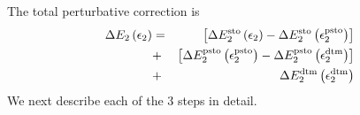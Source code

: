 \documentclass[%
preprint,
 superscriptaddress,
 amsmath,amssymb,
 aps,
]{revtex4-1}
\def\beq{\begin{eqnarray}}
\def\eeq{\end{eqnarray}}
\def\P{\mathcal{P}}
\begin{document}
The total perturbative correction is
\beq
\Delta E_{2} \left(\epsilon_{2}\right) &=& 
  \left[\Delta E_{2}^{\mathrm{sto}} \left(\epsilon_{2} \right) - \Delta E_{2}^{\mathrm{sto}} \left(\epsilon_{2}^{\rm psto}\right)\right] \nonumber \\
&+& \left[\Delta E_{2}^{\mathrm{psto}} \left(\epsilon_{2}^{\rm psto} \right) - \Delta E_{2}^{\mathrm{psto}} \left(\epsilon_{2}^{\rm dtm}\right)\right] \nonumber \\
&+& \Delta E_{2} ^{\mathrm{dtm}} \left(\epsilon_{2} ^{\mathrm{dtm}}\right)
\label{eq:semistoch_3-step_PT}
\eeq
We next describe each of the 3 steps in detail.

\end{document}
